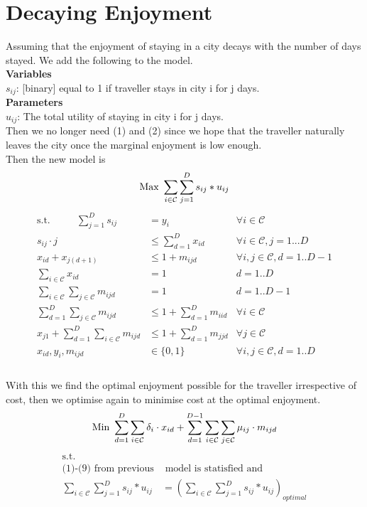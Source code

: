 \documentclass[a4paper]{article}
\begin{document}
\newpage
\section{Decaying Enjoyment}
Assuming that the enjoyment of staying in a city decays with the number of days stayed. We add the following to the model.\\

\textbf{Variables}\\
$s_{ij}$: [binary] equal to 1 if traveller stays in city i for j days.\\

\textbf{Parameters} \\
$u_{ij}$: The total utility of staying in city i for j days.\\

Then we no longer need (1) and (2) since we hope that the traveller naturally leaves the city once the marginal enjoyment is low enough.\\

Then the new model is 
\begin{equation*}
\text{Max } \sum_{i \in \mathcal{C}} \sum_{j=1}^{D} s_{ij} * u_{ij}\\
\end{equation*}
\begin{align}
\text{s.t.~~~~~~~~}
\sum_{j=1}^{D} s_{ij} &= y_{i} & \forall i \in \mathcal{C}\\
s_{ij} \cdot j &\leq \sum_{d=1}^{D} x_{id} & \forall i \in \mathcal{C}, j=1...D\\
x_{id} + x_{j(d+1)} & \leq 1 + m_{ijd} & \forall i,j \in \mathcal{C}, d = 1..D-1 \\
\sum_{i \in \mathcal{C}} x_{id} &= 1 & d = 1..D \\
\sum_{i \in \mathcal{C}} \sum_{j \in \mathcal{C}} m_{ijd} &= 1 & d = 1..D-1 \\
\sum_{d=1}^{D} \sum_{j \in \mathcal{C}} m_{ijd} &\leq 1 + \sum_{d=1}^{D} m_{iid} & \forall i \in \mathcal{C} \\
x_{j1} + \sum_{d=1}^{D} \sum_{i \in \mathcal{C}} m_{ijd} &\leq 1 + \sum_{d=1}^{D} m_{jjd} & \forall j \in \mathcal{C}\\
x_{id}, y_{i}, m_{ijd} & \in \{0,1\} & \forall i, j \in \mathcal{C}, d = 1..D\\
\end{align}\\
With this we find the optimal enjoyment possible for the traveller irrespective of cost, then we optimise again to minimise cost at the optimal enjoyment.
\begin{equation*}
\text{Min } \sum_{d=1}^{D} \sum_{i \in \mathcal{C}} \delta_{i} \cdot x_{id} + \sum_{d=1}^{D-1} \sum_{i \in \mathcal{C}} \sum_{j \in \mathcal{C}} \mu_{ij} \cdot m_{ijd}\\
\end{equation*}
\begin{align*}
\text{s.t.~~~~~~~~} & \\
\text{(1)-(9) from previous} &\text{ model is statisfied and} \\
\sum_{i \in \mathcal{C}} \sum_{j=1}^{D} s_{ij} * u_{ij} &= (\sum_{i \in \mathcal{C}} \sum_{j=1}^{D} s_{ij} * u_{ij})_{optimal}
\end{align*}\\
\end{document}
